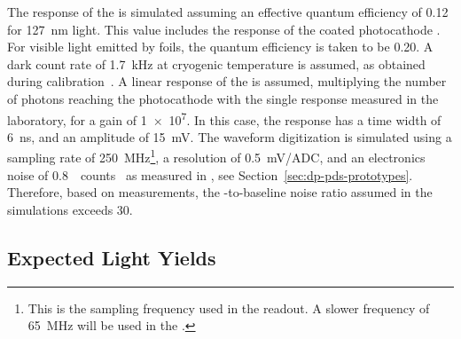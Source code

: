 The response of the  is simulated assuming an effective quantum efficiency of \num{0.12} for \SI{127}{\nm} light. This value includes the  response of the coated photocathode \cite{Bonesini:2018ubd}. For visible light emitted by  foils, the  quantum efficiency is taken to be \num{0.20}. A dark count rate of \SI{1.7}{\kilo\hertz} at cryogenic temperature is assumed, as obtained during   calibration~\cite{Belver:2018erf}. A linear response of the  is assumed, multiplying the number of photons reaching the photocathode with the single \phel response measured in the laboratory, for a gain of \num{1e7}. In this case, the  response has a time width of \SI{6}{\nano\s}, and an amplitude of \SI{15}{mV}. The waveform digitization is simulated using a sampling rate of \SI{250}{MHz}\footnote{This is the sampling frequency used in the  readout. A slower frequency of \SI{65}{MHz} will be used in the  .}, 
a resolution of \SI{0.5}{mV/ADC}, and an electronics noise of \SI{0.8}{ counts } as measured in , see Section~\ref{sec:dp-pds-prototypes}. Therefore, based on  measurements, the -to-baseline noise  ratio assumed in the simulations exceeds \num{30}.


\subsection{Expected Light Yields}
\label{subsec:dp-pds-simulation_yields}

